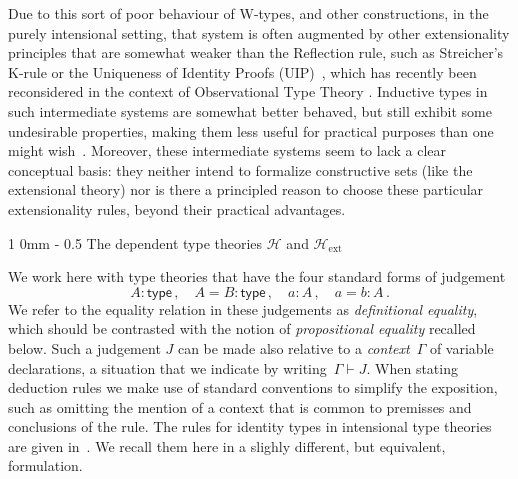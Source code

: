 \documentclass[reqno,10pt,a4paper,oneside]{amsart}
\makeatletter
\newcommand{\type}{\mathsf{type}}
\newcommand{\Hint}{\mathcal{H}}
\newcommand{\Hext}{\mathcal{H}_{\mathrm{ext}}}
\renewcommand{\section}{\@startsection
  {section}%
   {1}%
  {0mm}%
   {-\baselineskip}%
  {0.5\baselineskip}%
   {\Large\bfseries}}%
\numberwithin{equation}{section}
\theoremstyle{mythm}
\theoremstyle{mydef}
\theoremstyle{myrmk}
\makeatother
\begin{document}
Due to this sort of poor behaviour of W-types, and other constructions, in the purely intensional setting, that system is often augmented by other extensionality principles that are somewhat weaker than the Reflection rule, such as Streicher's K-rule  or the Uniqueness of Identity Proofs (UIP)~\cite{StreicherT:invitt}, which has recently been reconsidered
in the context of Observational Type Theory \cite{AltenkirchT:obsen}.  Inductive types in such intermediate systems are somewhat better behaved, but still exhibit some undesirable properties, making them less useful for practical purposes than one might wish~\cite{McBrideC:wtygnb}.  Moreover, these intermediate systems seem to lack a clear conceptual basis:  they neither intend to formalize constructive sets (like the extensional theory) nor is there a principled reason to choose these particular extensionality rules, beyond their practical advantages.  

\newpage


\section{The dependent type theories $\Hint$ and $\Hext$}
\label{section:prelim}


We work here with type theories that have the four standard forms of judgement
\[
A : \type \, , \quad A = B : \type \, , \quad   a : A \, , \quad a = b : A \, . 
\]
We refer to the equality relation in these judgements as \emph{definitional equality}, 
which should be contrasted with the notion of \emph{propositional equality}
recalled below. 
Such a judgement $J$ can be made also relative to a \emph{context}~$\Gamma$ of variable declarations, a situation that we indicate by writing~$\Gamma \vdash J$. When stating deduction
rules we make use of standard conventions to simplify the exposition, such as omitting the mention
of a context that is common to premisses and conclusions of the rule.
The rules for identity types in intensional type theories are given in~\cite[Section~5.5]{NordstromB:marltt}. We recall them here in a slighly different, but equivalent, formulation.
\end{document}

